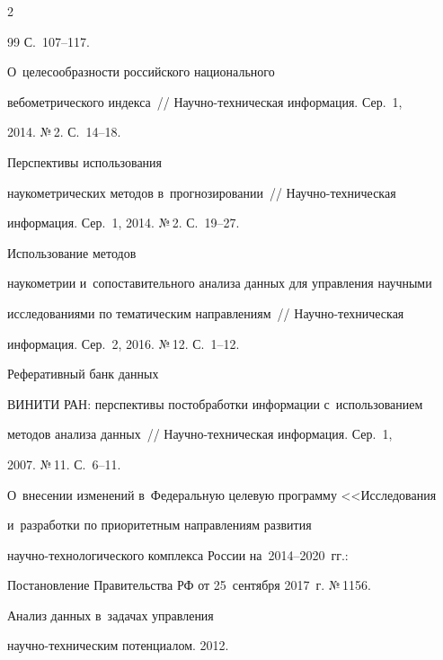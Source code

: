 \begin{multicols}{2}
{{\begin{thebibliography}{99}
С.~107--117.






 О~целесообразности российского национального 

вебометрического индекса~// На\-уч\-но-тех\-ни\-че\-ская информация. Сер.~1, 

2014. №\,2. С.~14--18.




 Перспективы использования 

наукометрических методов в~прогнозировании~// На\-уч\-но-тех\-ни\-че\-ская 

информация. Сер.~1, 2014. №\,2. С.~19--27. 




 Использование методов 

наукометрии и~сопоставительного анализа данных для управления научными 

исследованиями по тематическим направлениям~// На\-уч\-но-тех\-ни\-че\-ская 

информация. Сер.~2, 2016. №\,12. С.~1--12. 




 Реферативный банк данных 

ВИНИТИ РАН: перспективы постобработки информации с~использованием 

методов анализа данных~// На\-уч\-но-тех\-ни\-че\-ская информация. Сер.~1, 

2007. №\,11. С.~6--11.


О~внесении изменений в~Федеральную целевую программу <<Исследования 

и~разработки по приори\-тетным направлениям развития  

на\-уч\-но-тех\-но\-ло\-гическо\-го комплекса России на~2014--2020~гг.: 

Постанов\-ле\-ние Правительства РФ от 25~сентября 2017~г. №\,1156.


 Анализ данных в~задачах управ\-ле\-ния  

на\-уч\-но-тех\-ни\-че\-ским потенциалом. 2012. {\sf  

}
\end{thebibliography}}}
\end{multicols}
